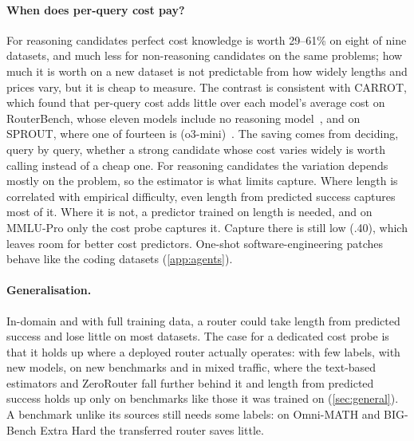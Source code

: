 \documentclass[10pt]{article}
\begin{document}
\paragraph{When does per-query cost pay?}
For reasoning candidates perfect cost knowledge is worth 29--61\% on eight of nine datasets, and much less for non-reasoning candidates on the same problems; how much it is worth on a new dataset is not predictable from how widely lengths and prices vary, but it is cheap to measure. The contrast is consistent with CARROT, which found that per-query cost adds little over each model's average cost on RouterBench, whose eleven models include no reasoning model~\citep{routerbench}, and on SPROUT, where one of fourteen is (o3-mini)~\citep{carrot}. The saving comes from deciding, query by query, whether a strong candidate whose cost varies widely is worth calling instead of a cheap one. For reasoning candidates the variation depends mostly on the problem, so the estimator is what limits capture. Where length is correlated with empirical difficulty, even length from predicted success captures most of it. Where it is not, a predictor trained on length is needed, and on MMLU-Pro only the cost probe captures it. Capture there is still low (.40), which leaves room for better cost predictors. One-shot software-engineering patches behave like the coding datasets (\cref{app:agents}).

\paragraph{Generalisation.}
In-domain and with full training data, a router could take length from predicted success and lose little on most datasets. The case for a dedicated cost probe is that it holds up where a deployed router actually operates: with few labels, with new models, on new benchmarks and in mixed traffic, where the text-based estimators and ZeroRouter fall further behind it and length from predicted success holds up only on benchmarks like those it was trained on (\cref{sec:general}). A benchmark unlike its sources still needs some labels: on Omni-MATH and BIG-Bench Extra Hard the transferred router saves little.
\end{document}
